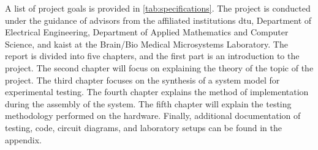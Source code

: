 A list of project goals is provided in \cref{tab:specifications}. The project is conducted under the guidance of advisors from the affiliated institutions \Gls{dtu}, Department of Electrical Engineering, Department of Applied Mathematics and Computer Science, and \Gls{kaist} at the Brain/Bio Medical Microsystems Laboratory.  The report is divided into five chapters, and the first part is an introduction to the project. The second chapter will focus on explaining the theory of the topic of the project. The third chapter focuses on the synthesis of a system model for experimental testing. The fourth chapter explains the method of implementation during the assembly of the system. The fifth chapter will explain the testing methodology performed on the hardware. Finally, additional documentation of testing, code, circuit diagrams, and laboratory setups can be found in the appendix.

